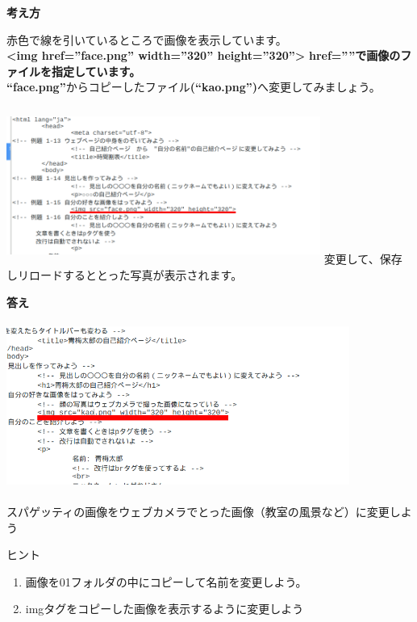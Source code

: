 \documentclass[a4paper,12pt]{jarticle}
\begin{document}
\clearpage
\flushleft
\textbf{考え方}\ \


赤色で線を引いているところで画像を表示しています。\\
\textbf{{\textless}img href=”face.png” width=”320” height=”320”{\textgreater}}
\textbf{href=””で画像のファイルを指定しています。}\\
\textbf{“face.png”}からコピーしたファイル\textbf{(“kao.png”)}へ変更してみましょう。

\begin{minipage}{16.576cm}
  \includegraphics[width=10.296cm,height=5.145cm]{textbook-img171.png}
  \newline
  変更して、保存しリロードするととった写真が表示されます。
\end{minipage}

\flushleft
\textbf{答え}

\includegraphics[width=11.255cm,height=5.482cm]{textbook-img172.png}



\theQuestion

スパゲッティの画像をウェブカメラでとった画像（教室の風景など）に変更しよう

ヒント

\begin{enumerate}
  \item
        画像を01フォルダの中にコピーして名前を変更しよう。
  \item
        imgタグをコピーした画像を表示するように変更しよう
\end{enumerate}
\theQuestion\label{Q:hasAnswer04-3}
\end{document}
